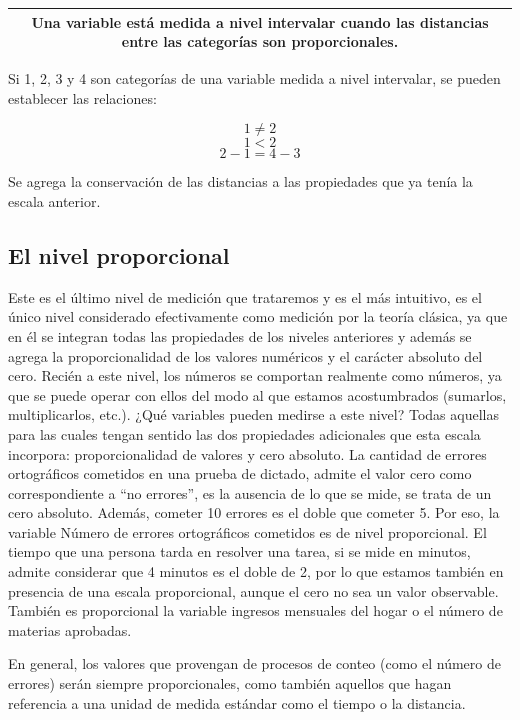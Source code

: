 \documentclass[]{book}
\begin{document}
\begin{longtable}[]{@{}c@{}}
\toprule
\endhead
\begin{minipage}[t]{0.97\columnwidth}\centering
Una variable está medida a nivel \textbf{intervalar} cuando las distancias entre las categorías son proporcionales.\strut
\end{minipage}\tabularnewline
\bottomrule
\end{longtable}

Si 1, 2, 3 y 4 son categorías de una variable medida a nivel intervalar, se pueden establecer las relaciones:

\[1 \neq 2\]
\[1 < 2\]
\[2 - 1 = 4 - 3\]

Se agrega la conservación de las distancias a las propiedades que ya tenía la escala anterior.

\hypertarget{el-nivel-proporcional}{%
\subsection{El nivel proporcional}\label{el-nivel-proporcional}}

Este es el último nivel de medición que trataremos y es el más intuitivo, es el único nivel considerado efectivamente como medición por la teoría clásica, ya que en él se integran todas las propiedades de los niveles anteriores y además se agrega la proporcionalidad de los valores numéricos y el carácter absoluto del cero. Recién a este nivel, los números se comportan realmente como números, ya que se puede operar con ellos del modo al que estamos acostumbrados (sumarlos, multiplicarlos, etc.). ¿Qué variables pueden medirse a este nivel? Todas aquellas para las cuales tengan sentido las dos propiedades adicionales que esta escala incorpora: proporcionalidad de valores y cero absoluto. La cantidad de errores ortográficos cometidos en una prueba de dictado, admite el valor cero como correspondiente a ``no errores'', es la ausencia de lo que se mide, se trata de un cero absoluto. Además, cometer 10 errores es el doble que cometer 5. Por eso, la variable Número de errores ortográficos cometidos es de nivel proporcional. El tiempo que una persona tarda en resolver una tarea, si se mide en minutos, admite considerar que 4 minutos es el doble de 2, por lo que estamos también en presencia de una escala proporcional, aunque el cero no sea un valor observable. También es proporcional la variable ingresos mensuales del hogar o el número de materias aprobadas.

En general, los valores que provengan de procesos de conteo (como el número de errores) serán siempre proporcionales, como también aquellos que hagan referencia a una unidad de medida estándar como el tiempo o la distancia.
\end{document}
